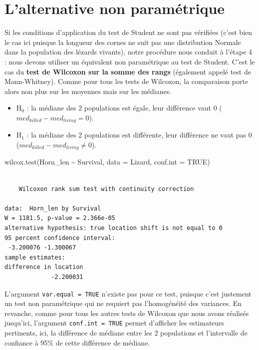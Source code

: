\documentclass[
  french,
  a4paper,
  DIV=11,
  numbers=noendperiod,
  oneside]{scrreprt}
\newenvironment{Shaded}{}{}
\newcommand{\AttributeTok}[1]{\textcolor[rgb]{0.84,0.23,0.29}{#1}}
\newcommand{\ConstantTok}[1]{\textcolor[rgb]{0.00,0.36,0.77}{#1}}
\newcommand{\FunctionTok}[1]{\textcolor[rgb]{0.44,0.26,0.76}{#1}}
\newcommand{\NormalTok}[1]{\textcolor[rgb]{0.14,0.16,0.18}{#1}}
\newcommand{\SpecialCharTok}[1]{\textcolor[rgb]{0.00,0.36,0.77}{#1}}
\providecommand{\tightlist}{%
  \setlength{\itemsep}{0pt}\setlength{\parskip}{0pt}}
\begin{document}
\section{L'alternative non
paramétrique}\label{lalternative-non-paramuxe9trique-2}

Si les conditions d'application du test de Student ne sont pas vérifiées
(c'est bien le cas ici puisque la longueur des cornes ne suit pas une
distribution Normale dans la population des lézards vivants), notre
procédure nous conduit à l'étape 4 : nous devons utiliser un équivalent
non paramétrique au test de Student. C'est le cas du \textbf{test de
Wilcoxon sur la somme des rangs} (également appelé test de
Mann-Whitney). Comme pour tous les tests de Wilcoxon, la comparaison
porte alors non plus sur les moyennes mais sur les médianes.

\begin{itemize}
\tightlist
\item
  H\(_0\) : la médiane des 2 populations est égale, leur différence vaut
  0 (\(med_{killed}-med_{living} = 0\)).
\item
  H\(_1\) : la médiane des 2 populations est différente, leur différence
  ne vaut pas 0 (\(med_{killed}-med_{living}\neq 0\)).
\end{itemize}

\begin{Shaded}
\begin{Highlighting}[]
\FunctionTok{wilcox.test}\NormalTok{(Horn\_len }\SpecialCharTok{\textasciitilde{}}\NormalTok{ Survival, }\AttributeTok{data =}\NormalTok{ Lizard, }\AttributeTok{conf.int =} \ConstantTok{TRUE}\NormalTok{)}
\end{Highlighting}
\end{Shaded}

\begin{verbatim}

    Wilcoxon rank sum test with continuity correction

data:  Horn_len by Survival
W = 1181.5, p-value = 2.366e-05
alternative hypothesis: true location shift is not equal to 0
95 percent confidence interval:
 -3.200076 -1.300067
sample estimates:
difference in location 
             -2.200031 
\end{verbatim}

L'argument \texttt{var.equal\ =\ TRUE} n'existe pas pour ce test,
puisque c'est justement un test non paramétrique qui ne requiert pas
l'homogénéité des variances. En revanche, comme pour tous les autres
tests de Wilcoxon que nous avons réalisés jusqu'ici, l'argument
\texttt{conf.int\ =\ TRUE} permet d'afficher les estimateurs pertinents,
ici, la différence de médiane entre les 2 populations et l'intervalle de
confiance à 95\% de cette différence de médiane.
\end{document}
